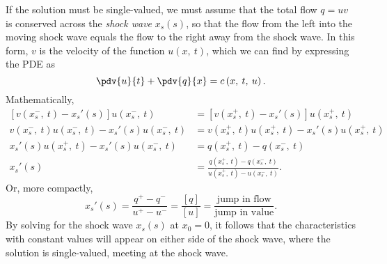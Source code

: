 \documentclass{article}
\theoremstyle{definition}
\begin{document}
If the solution must be single-valued, we must assume that the total
flow \(q = u v\) is conserved across the \textit{shock wave}
\(x_s\left( s \right)\), so that the flow from the left into the moving
shock wave equals the flow to the right away from the shock wave. In
this form, \(v\) is the velocity of the function \(u\left( x,\: t
\right)\), which we can find by expressing the PDE as
\begin{equation*}
    \pdv{u}{t} + \pdv{q}{x} = c\left( x,\: t,\: u \right).
\end{equation*}
Mathematically,
\begin{align*}
    \left[ v\left( x_s^-,\: t \right) - x_s'\left( s \right) \right] u\left( x_s^-,\: t \right)             & = \left[ v\left( x_s^+,\: t \right) - x_s'\left( s \right) \right] u\left( x_s^+,\: t \right)                              \\
    v\left( x_s^-,\: t \right) u\left( x_s^-,\: t \right) - x_s'\left( s \right) u\left( x_s^-,\: t \right) & = v\left( x_s^+,\: t \right) u\left( x_s^+,\: t \right) - x_s'\left( s \right) u\left( x_s^+,\: t \right)                  \\
    x_s'\left( s \right) u\left( x_s^+,\: t \right) - x_s'\left( s \right) u\left( x_s^-,\: t \right)       & = q\left( x_s^+,\: t \right) - q\left( x_s^-,\: t \right)                                                                  \\
    x_s'\left( s \right)                                                                                    & = \frac{q\left( x_s^+,\: t \right) - q\left( x_s^-,\: t \right)}{u\left( x_s^+,\: t \right) - u\left( x_s^-,\: t \right)}.
\end{align*}
Or, more compactly,
\begin{equation*}
    x_s'\left( s \right) = \frac{q^+ - q^-}{u^+ - u^-} = \frac{\left[ q \right]}{\left[ u \right]} = \frac{\text{jump in flow}}{\text{jump in value}}.
\end{equation*}
By solving for the shock wave \(x_s\left( s \right)\) at \(x_0 = 0\), it
follows that the characteristics with constant values will appear on
either side of the shock wave, where the solution is single-valued,
meeting at the shock wave.
\end{document}
